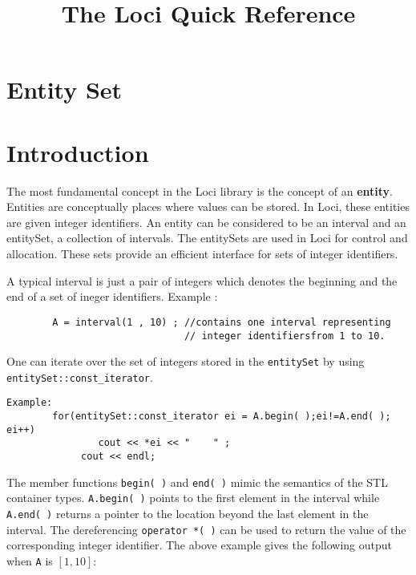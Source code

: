 \documentclass[letterpaper,12pt]{article}
\begin{document}
\title{\bf The Loci Quick Reference} 
\date{ }
\maketitle

\section{Entity Set}

\section*{Introduction}

The most fundamental concept in the Loci library is the concept of an
{\bf entity}.  Entities are conceptually places where values can be
stored. In Loci, these entities are given integer identifiers. An
entity can be considered to be an interval and an entitySet, a
collection of intervals. The entitySets are used in Loci for control
and allocation. These sets provide an efficient interface for sets of
integer identifiers.

A typical interval is just a pair of integers which denotes the beginning and 
the end of a set of ineger identifiers. 
Example : 
\begin{verbatim}
        A = interval(1 , 10) ; //contains one interval representing
                               // integer identifiersfrom 1 to 10.
\end{verbatim}

One can iterate over the set of integers stored in the {\tt entitySet} by using\\
{\tt entitySet::const\_iterator}.

\begin{verbatim}
Example:  
        for(entitySet::const_iterator ei = A.begin( );ei!=A.end( ); ei++)
                cout << *ei << "    " ;
             cout << endl;
\end{verbatim}
The member functions {\tt begin( )} and {\tt end( )} mimic the
semantics of the STL container types. {\tt A.begin( )} points to the first
element in the interval while {\tt A.end( )} returns a pointer to the
location beyond the last element in the interval. The dereferencing
{\tt operator *( )} can be used to return the value of the corresponding
integer identifier. The above example gives the following output when
{\tt A} is $[1, 10]$:
\end{document}
